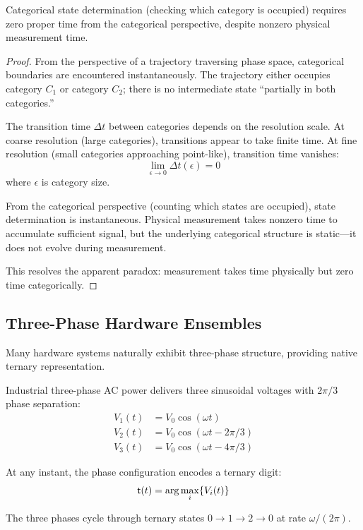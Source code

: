 \begin{theorem}
\label{thm:zero_time}
Categorical state determination (checking which category is occupied) requires zero proper time from the categorical perspective, despite nonzero physical measurement time.
\end{theorem}

\begin{proof}
From the perspective of a trajectory traversing phase space, categorical boundaries are encountered instantaneously. The trajectory either occupies category $C_1$ or category $C_2$; there is no intermediate state ``partially in both categories.''

The transition time $\Delta t$ between categories depends on the resolution scale. At coarse resolution (large categories), transitions appear to take finite time. At fine resolution (small categories approaching point-like), transition time vanishes:
\begin{equation}
\lim_{\epsilon \to 0} \Delta t(\epsilon) = 0
\end{equation}
where $\epsilon$ is category size.

From the categorical perspective (counting which states are occupied), state determination is instantaneous. Physical measurement takes nonzero time to accumulate sufficient signal, but the underlying categorical structure is static—it does not evolve during measurement.

This resolves the apparent paradox: measurement takes time physically but zero time categorically.
\end{proof}

\subsection{Three-Phase Hardware Ensembles}

Many hardware systems naturally exhibit three-phase structure, providing native ternary representation.

\begin{example}
\label{ex:three_phase_power}
Industrial three-phase AC power delivers three sinusoidal voltages with $2\pi/3$ phase separation:
\begin{align}
V_1(t) &= V_0 \cos(\omega t) \\
V_2(t) &= V_0 \cos(\omega t - 2\pi/3) \\
V_3(t) &= V_0 \cos(\omega t - 4\pi/3)
\end{align}

At any instant, the phase configuration encodes a ternary digit:
\begin{equation}
\mathsf{t}(t) = \arg\max_i \{V_i(t)\}
\end{equation}

The three phases cycle through ternary states $0 \to 1 \to 2 \to 0$ at rate $\omega/(2\pi)$.
\end{example}

